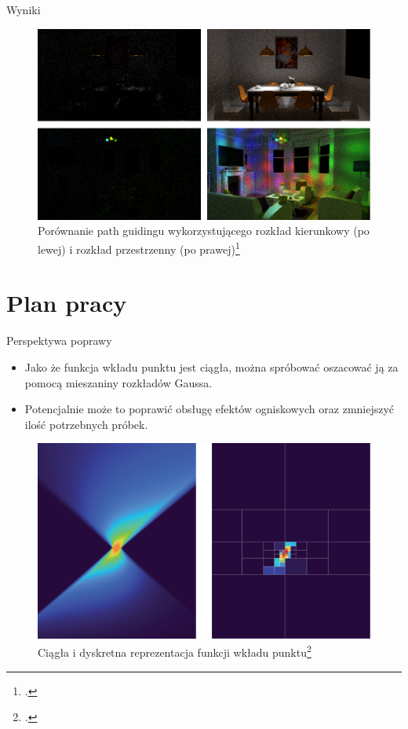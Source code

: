 \documentclass{beamer}
\begin{document}
\begin{frame}{Wyniki}
    \begin{figure}
        \centering
        \includegraphics[width=1\linewidth]{img/ruppert_vs_rath.png}
        \caption{Porównanie path guidingu wykorzystującego rozkład kierunkowy (po lewej) i rozkład przestrzenny (po prawej)\footcite{Focal_Guiding}}
        \label{fig:enter-label}
    \end{figure}
\end{frame}

\section{Plan pracy}
\begin{frame}{Perspektywa poprawy}
\begin{itemize}
    \item Jako że funkcja wkładu punktu jest ciągła, można spróbować oszacować ją za pomocą mieszaniny rozkładów Gaussa.
    \item Potencjalnie może to poprawić obsługę efektów ogniskowych oraz zmniejszyć ilość potrzebnych próbek.
\end{itemize}
\begin{figure}
    \centering
    \includegraphics[width=0.5\linewidth]{img/descrite_vs_continuous.png}
    \caption{Ciągła i dyskretna reprezentacja funkcji wkładu punktu\footcite{Focal_Guiding}}
    \label{fig:enter-label}
\end{figure}
\end{frame}
\end{document}
